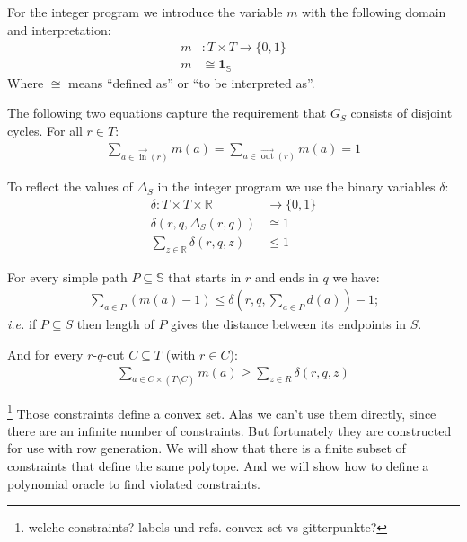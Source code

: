 \documentclass[a4paper]{amsart} %
\def\ie{\emph{i.e.}}
\newcommand{\todo}[1]{\footnote{#1}}
\DeclareMathOperator{\In}{in}
\DeclareMathOperator{\Out}{out}
\newcommand{\ina}{\ensuremath{\vec{\In}}}
\newcommand{\outa}{\ensuremath{\vec{\Out}}}
\begin{document}
For the integer program we introduce the variable \(m\) with the
following domain and interpretation:
\begin{align}
  m & \colon T \times T \to \{0,1\} \\
  m & \cong \mathbf{1}_{\mathbb{S}}
\end{align}
Where \(\cong\) means ``defined as'' or ``to be interpreted as''.

The following two equations capture the requirement that \(G_S\)
consists of disjoint cycles.  For all \(r \in T\):
\begin{align}
  \label{matchBedingung}
  \sum_{a \in \ina(r)}  m(a) = \sum_{a \in \outa(r)} m(a) = 1
\end{align}

To reflect the values of \(\Delta_S\) in the integer program we use the binary variables \(\delta\):
\begin{align}
  \delta \colon T \times T \times \mathbb{R} & \to \{0,1\} \\
  \delta\left(r, q, \Delta_S\left(r,q\right)\right) &\cong 1 \\
  \label{onlyOne}
  \sum_{z \in \mathbb{R}} \delta(r, q, z) &\leq 1
\end{align}

For every simple path \(P \subseteq \mathbb{S}\) that starts in \(r\) and ends in \(q\) we have:
\begin{align}
\label{zwingHoch}
\sum_{a \in P} (m(a) - 1) \leq \delta \left(r,q, \sum_{a \in P} d \left(a\right)\right) - 1 \textrm{;}
\end{align}
\ie{} if \(P \subseteq S\) then length of \(P\) gives
the distance between its endpoints in \(S\).

And for every \(r\)-\(q\)-cut \(C \subseteq T\) (with \(r \in C\)):
\begin{align}
\label{zwingRunter}
  \sum_{a \in C \times (T \setminus C)} m(a) \geq \sum_{z \in R} \delta (r,q, z)
\end{align}





\todo{welche constraints?  labels und refs.  convex set vs gitterpunkte?}
Those constraints define a convex set.  Alas we can't use them
directly, since there are an infinite number of constraints.  But
fortunately they are constructed for use with row generation.  We will
show that there is a finite subset of constraints that define the same
polytope.  And we will show how to define a polynomial oracle to find
violated constraints.
\end{document}
